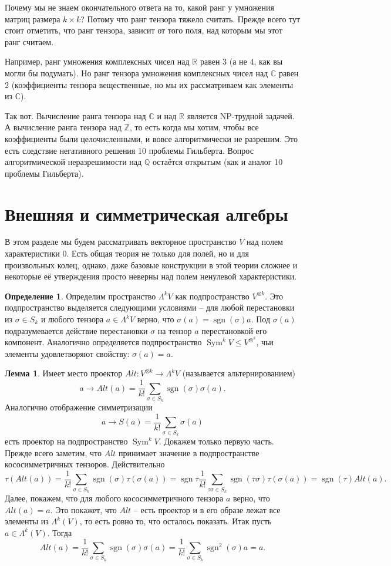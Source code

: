\documentclass[10pt,a4paper,oneside]{book}
\theoremstyle{definition}
\newtheorem*{defn}{\color{yellow!30!red} Определение}
\newtheorem{lem}{\color{green!50!black}Лемма}
\renewcommand{\leq}{\leqslant}
\newcommand{\mb}[1]{\mathbb{#1}}
\newcommand{\Sym}{\operatorname{Sym}}
\newcommand{\sgn}{\operatorname{sgn}}
\def\dfn{\begin{defn}}
\def\edfn{\end{defn}}
\def\lm{\begin{lem}}
\def\elm{\end{lem}}
\begin{document}
Почему мы не знаем окончательного ответа на то, какой ранг у умножения матриц размера $k\times k$? Потому что ранг тензора тяжело считать. Прежде всего тут стоит отметить, что ранг тензора, зависит от того поля, над которым мы этот ранг считаем. 

Например, ранг умножения комплексных чисел над $\mb R$ равен $3$ (а не $4$, как вы могли бы подумать). Но ранг тензора умножения комплексных чисел над $\mb C$ равен $2$ (коэффициенты тензора вещественные, но мы их  рассматриваем как элементы из $\mb C$).  

Так вот. Вычисление ранга тензора над $\mb C$ и над $\mb R$ является NP-трудной задачей. А вычисление ранга тензора над $\mb Z$, то есть когда мы хотим, чтобы все коэффициенты были целочисленными, и вовсе алгоритмически не разрешим. Это есть следствие негативного решения 10 проблемы Гильберта. Вопрос алгоритмической неразрешимости над $\mb Q$ остаётся открытым (как и аналог 10 проблемы Гильберта).




\section{Внешняя и симметрическая алгебры}

В этом разделе мы будем рассматривать векторное пространство $V$ над полем характеристики $0$. Есть общая теория не только для полей, но и для произвольных колец, однако, даже базовые конструкции в этой теории сложнее и некоторые её утверждения просто неверны над полем ненулевой характеристики.

\dfn Определим пространство $\Lambda^k V$ как подпространство $V^{\otimes k}$. Это подпространство выделяется следующими условиями -- для любой перестановки из $\sigma \in S_k$ и любого тензора $a\in \Lambda^k V$ верно, что $\sigma(a)=\sgn(\sigma)a$. Под $\sigma(a)$ подразумевается действие перестановки $\sigma$ на тензор $a$ перестановкой его компонент. Аналогично определяется подпространство $\Sym^k V \leq V^{\otimes^k}$, чьи элементы удовлетворяют свойству: $\sigma(a)=a$.
\edfn

\lm Имеет место проектор $Alt \colon V^{\otimes k} \to \Lambda^k V$ (называется альтернированием) 
$$a \to Alt(a)=\frac{1}{k!} \sum_{\sigma \in S_k} \sgn (\sigma) \sigma(a).$$
Аналогично отображение  симметризации
$$ a \to S(a)= \frac{1}{k!} \sum_{\sigma \in S_k} \sigma(a)$$
есть проектор на подпространство $\Sym^k V$.
\proof Докажем только первую часть. Прежде всего заметим, что $Alt$ принимает значение в подпространстве кососимметричных тензоров. Действительно 
$$\tau(Alt(a))=\frac{1}{k!}\sum_{\sigma \in S_k}\sgn(\sigma) \tau(\sigma(a))= \sgn{\tau} \frac{1}{k!}\sum_{\tau\sigma \in S_k} \sgn(\tau\sigma) \tau(\sigma(a))=\sgn(\tau) Alt(a).$$
Далее, покажем, что для любого кососимметричного тензора $a$ верно, что $Alt(a)=a$. Это покажет, что $Alt$ -- есть проектор и в его образе лежат все элементы из $\Lambda^k(V)$, то есть ровно то, что осталось показать. Итак пусть $a\in \Lambda^k(V)$. Тогда 
$$Alt(a)=\frac{1}{k!} \sum_{\sigma \in S_k} \sgn (\sigma) \sigma(a)=\frac{1}{k!} \sum_{\sigma \in S_k} \sgn^2(\sigma) a=a.$$
\endproof
\elm
\end{document}

